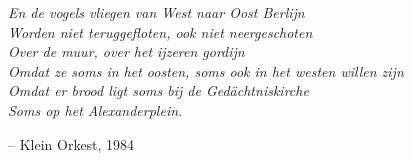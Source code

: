 \thispagestyle{empty} %
\vspace*{3cm}
\begin{center}
\begin{minipage}[c]{0.6\paperwidth}%
    \vspace{2ex}
    \textit{En de vogels vliegen van West naar Oost Berlijn} \\
    \textit{Worden niet teruggefloten, ook niet neergeschoten} \\
    \textit{Over de muur, over het ijzeren gordijn} \\
    \textit{Omdat ze soms in het oosten, soms ook in het westen willen zijn} \\
    \textit{Omdat er brood ligt soms bij de Gedächtniskirche} \\
    \textit{Soms op het Alexanderplein.} \par
    \vspace{2ex}
    \hfill -- Klein Orkest, 1984
  \end{minipage}
\end{center}